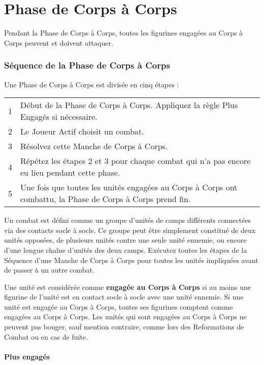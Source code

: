 
\hypertarget{closecombatphase}{\part{Phase de Corps à Corps}}

Pendant la Phase de Corps à Corps, toutes les figurines engagées au Corps à Corps peuvent et doivent attaquer.

\section{Séquence de la Phase de Corps à Corps}

Une Phase de Corps à Corps est divisée en cinq étapes :

\hspace*{0.3cm}
\begin{tabular}{c|m{14cm}}
1 & Début de la Phase de Corps à Corps. Appliquez la règle Plus Engagés si nécessaire. \tabularnewline
2 & Le Joueur Actif choisit un combat. \tabularnewline
3 & Résolvez cette Manche de Corps à Corps. \tabularnewline
4 & Répétez les étapes 2 et 3 pour chaque combat qui n'a pas encore eu lieu pendant cette phase. \tabularnewline
5 & Une fois que toutes les unités engagées au Corps à Corps ont combattu, la Phase de Corps à Corps prend fin. \tabularnewline
\end{tabular}

Un combat est défini comme un groupe d'unités de camps différents connectées via des contacts socle à socle. Ce groupe peut être simplement constitué de deux unités opposées, de plusieurs unités contre une seule unité ennemie, ou encore d'une longue chaîne d'unités des deux camps. Exécutez toutes les étapes de la Séquence d'une Manche de Corps à Corps pour toutes les unités impliquées avant de passer à un autre combat.

Une unité est considérée comme \textbf{engagée au Corps à Corps} si au moins une figurine de l'unité est en contact socle à socle avec une unité ennemie. Si une unité est engagée au Corps à Corps, toutes ses figurines comptent comme engagées au Corps à Corps. Les unités qui sont engagées au Corps à Corps ne peuvent pas bouger, sauf mention contraire, comme lors des Reformations de Combat ou en cas de fuite.

\hypertarget{nolongerengaged}{\subsection{Plus engagés}}

